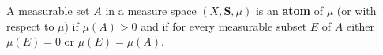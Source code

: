 A measurable set $A$ in a measure space $(X, \mathbf{S}, \mu)$ is an \textbf{atom} of $\mu$ (or with respect to $\mu$) if $\mu(A) > 0$ and if for every measurable subset $E$ of $A$ either $\mu(E) = 0$ or $\mu(E) = \mu(A)$.
